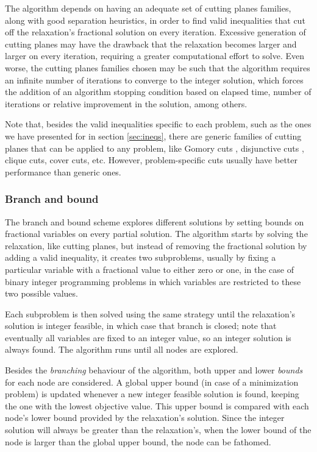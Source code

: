 The algorithm depends on having an adequate set of cutting planes families, along with good separation heuristics, in order to find valid inequalities that cut off the relaxation's fractional solution on every iteration. Excessive generation of cutting planes may have the drawback that the relaxation becomes larger and larger on every iteration, requiring a greater computational effort to solve. Even worse, the cutting planes families chosen may be such that the algorithm requires an infinite number of iterations to converge to the integer solution, which forces the addition of an algorithm stopping condition based on elapsed time, number of iterations or relative improvement in the solution, among others.

Note that, besides the valid inequalities specific to each problem, such as the ones we have presented for \PCP{} in section \ref{sec:ineqs}, there are generic families of cutting planes that can be applied to any problem, like Gomory cuts \cite{gomory1958outline}, disjunctive cuts \cite{balas1993lift}, clique cuts, cover cuts, etc. However, problem-specific cuts usually have better performance than generic ones.

\subsubsection{Branch and bound}

The branch and bound scheme explores different solutions by setting bounds on fractional variables on every partial solution. The algorithm starts by solving the relaxation, like cutting planes, but instead of removing the fractional solution by adding a valid inequality, it creates two subproblems, usually by fixing a particular variable with a fractional value to either zero or one, in the case of binary integer programming problems in which variables are restricted to these two possible values. 

Each subproblem is then solved using the same strategy until the relaxation's solution is integer feasible, in which case that branch is closed; note that eventually all variables are fixed to an integer value, so an integer solution is always found. The algorithm runs until all nodes are explored.

Besides the \textit{branching} behaviour of the algorithm, both upper and lower \textit{bounds} for each node are considered. A global upper bound (in case of a minimization problem) is updated whenever a new integer feasible solution is found, keeping the one with the lowest objective value. This upper bound is compared with each node's lower bound provided by the relaxation's solution. Since the integer solution will always be greater than the relaxation's, when the lower bound of the node is larger than the global upper bound, the node can be fathomed.

